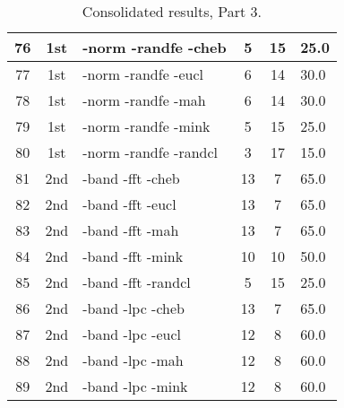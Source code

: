 \begin{table}
\begin{tabular}{|c|c|l|c|c|l|}
76 & 1st & -norm -randfe -cheb & 5 & 15 & 25.0\\ \hline
77 & 1st & -norm -randfe -eucl & 6 & 14 & 30.0\\ \hline
78 & 1st & -norm -randfe -mah & 6 & 14 & 30.0\\ \hline
79 & 1st & -norm -randfe -mink & 5 & 15 & 25.0\\ \hline
80 & 1st & -norm -randfe -randcl & 3 & 17 & 15.0\\ \hline
81 & 2nd & -band -fft -cheb & 13 & 7 & 65.0\\ \hline
82 & 2nd & -band -fft -eucl & 13 & 7 & 65.0\\ \hline
83 & 2nd & -band -fft -mah & 13 & 7 & 65.0\\ \hline
84 & 2nd & -band -fft -mink & 10 & 10 & 50.0\\ \hline
85 & 2nd & -band -fft -randcl & 5 & 15 & 25.0\\ \hline
86 & 2nd & -band -lpc -cheb & 13 & 7 & 65.0\\ \hline
87 & 2nd & -band -lpc -eucl & 12 & 8 & 60.0\\ \hline
88 & 2nd & -band -lpc -mah & 12 & 8 & 60.0\\ \hline
89 & 2nd & -band -lpc -mink & 12 & 8 & 60.0\\ \hline
\end{tabular}
\caption{Consolidated results, Part 3.}
\label{tab:results}
\end{table}

